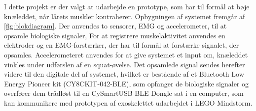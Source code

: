 I dette projekt er der valgt at udarbejde en prototype, som har til formål at bøje knæleddet, når lårets muskler kontraherer. Opbygningen af systemet fremgår af \autoref{fig:blokdiagram}. Der anvendes to sensorer, EMG og accelerometer, til at opsamle biologiske signaler, For at registrere muskelaktivitet anvendes en elektroder og en EMG-forstærker, der har til formål at forstærke signalet, der opsamles. Accelerometeret anvendes for at give systemet et input om, knæleddet vinkles  under udførslen af en squat-øvelse. Det opsamlede signal sendes herefter videre til den digitale del af systemet, hvilket er bestående af et Bluetooth Low Energy Pioneer kit (CY8CKIT-042-BLE), som opfanger de biologiske signaler og overfører dem trådløst til en CySmartUSB BLE Dongle sat i en computer, som kan kommunikere med prototypen af exoskelettet udarbejdet i LEGO Mindstorm. 


